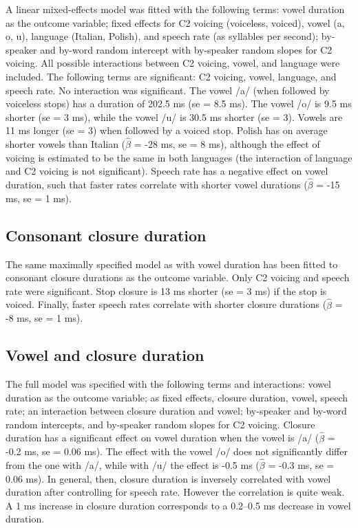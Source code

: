 \documentclass[preprint]{JASAnew}
\begin{document}
A linear mixed-effects model was fitted with the following terms: vowel
duration as the outcome variable; fixed effects for C2 voicing
(voiceless, voiced), vowel (a, o, u), language (Italian, Polish), and
speech rate (as syllables per second); by-speaker and by-word random
intercept with by-speaker random slopes for C2 voicing. All possible
interactions between C2 voicing, vowel, and language were included. The
following terms are significant: C2 voicing, vowel, language, and speech
rate. No interaction was significant. The vowel /a/ (when followed by
voiceless stops) has a duration of 202.5 ms (se = 8.5 ms). The vowel /o/
is 9.5 ms shorter (se = 3 ms), while the vowel /u/ is 30.5 ms shorter
(se = 3). Vowels are 11 ms longer (se = 3) when followed by a voiced
stop. Polish has on average shorter vowels than Italian (\(\hat{\beta}\)
= -28 ms, se = 8 ms), although the effect of voicing is estimated to be
the same in both languages (the interaction of language and C2 voicing
is not significant). Speech rate has a negative effect on vowel
duration, such that faster rates correlate with shorter vowel durations
(\(\hat{\beta}\) = -15 ms, se = 1 ms).

\hypertarget{consonant-closure-duration}{%
\subsection{Consonant closure
duration}\label{consonant-closure-duration}}

The same maximally specified model as with vowel duration has been
fitted to consonant closure durations as the outcome variable. Only C2
voicing and speech rate were significant. Stop closure is 13 ms shorter
(se = 3 ms) if the stop is voiced. Finally, faster speech rates
correlate with shorter closure durations (\(\hat{\beta}\) = -8 ms, se =
1 ms).

\hypertarget{vowel-and-closure-duration}{%
\subsection{Vowel and closure
duration}\label{vowel-and-closure-duration}}

The full model was specified with the following terms and interactions:
vowel duration as the outcome variable; as fixed effects, closure
duration, vowel, speech rate; an interaction between closure duration
and vowel; by-speaker and by-word random intercepts, and by-speaker
random slopes for C2 voicing. Closure duration has a significant effect
on vowel duration when the vowel is /a/ (\(\hat{\beta}\) = -0.2 ms, se =
0.06 ms). The effect with the vowel /o/ does not significantly differ
from the one with /a/, while with /u/ the effect is -0.5 ms
(\(\hat{\beta}\) = -0.3 ms, se = 0.06 ms). In general, then, closure
duration is inversely correlated with vowel duration after controlling
for speech rate. However the correlation is quite weak. A 1 ms increase
in closure duration corresponds to a 0.2--0.5 ms decrease in vowel
duration.
\end{document}
